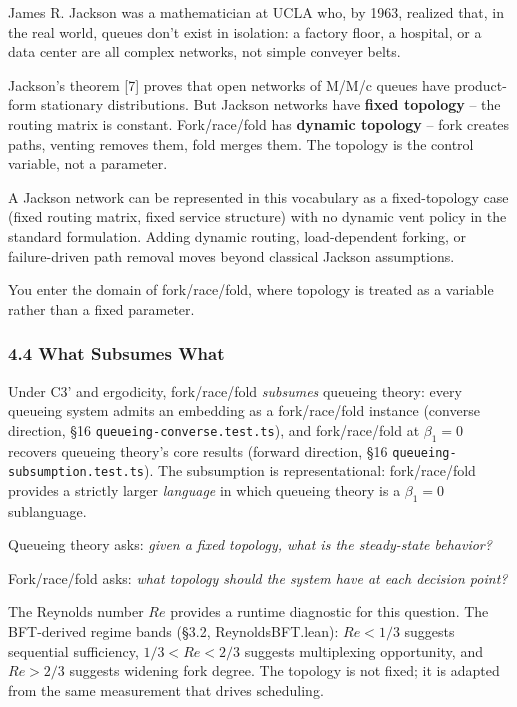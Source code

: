 \documentclass[
  11pt,
]{article}
\begin{document}
James R. Jackson was a mathematician at UCLA who, by 1963, realized
that, in the real world, queues don't exist in isolation: a factory
floor, a hospital, or a data center are all complex networks, not simple
conveyer belts.

Jackson's theorem {[}7{]} proves that open networks of M/M/c queues have
product-form stationary distributions. But Jackson networks have
\textbf{fixed topology} -- the routing matrix is constant.
Fork/race/fold has \textbf{dynamic topology} -- fork creates paths,
venting removes them, fold merges them. The topology is the control
variable, not a parameter.

A Jackson network can be represented in this vocabulary as a
fixed-topology case (fixed routing matrix, fixed service structure) with
no dynamic vent policy in the standard formulation. Adding dynamic
routing, load-dependent forking, or failure-driven path removal moves
beyond classical Jackson assumptions.

You enter the domain of fork/race/fold, where topology is treated as a
variable rather than a fixed parameter.

\subsubsection{4.4 What Subsumes What}\label{what-subsumes-what}

Under C3' and ergodicity, fork/race/fold \emph{subsumes} queueing
theory: every queueing system admits an embedding as a fork/race/fold
instance (converse direction, §16 \texttt{queueing-converse.test.ts}),
and fork/race/fold at \(\beta_1 = 0\) recovers queueing theory's core
results (forward direction, §16 \texttt{queueing-subsumption.test.ts}).
The subsumption is representational: fork/race/fold provides a strictly
larger \emph{language} in which queueing theory is a \(\beta_1 = 0\)
sublanguage.

Queueing theory asks: \emph{given a fixed topology, what is the
steady-state behavior?}

Fork/race/fold asks: \emph{what topology should the system have at each
decision point?}

The Reynolds number \(Re\) provides a runtime diagnostic for this
question. The BFT-derived regime bands (\S3.2, ReynoldsBFT.lean):
\(Re < 1/3\) suggests sequential sufficiency, \(1/3 < Re < 2/3\)
suggests multiplexing opportunity, and \(Re > 2/3\) suggests widening
fork degree. The topology is not fixed; it is adapted from the same
measurement that drives scheduling.
\end{document}
